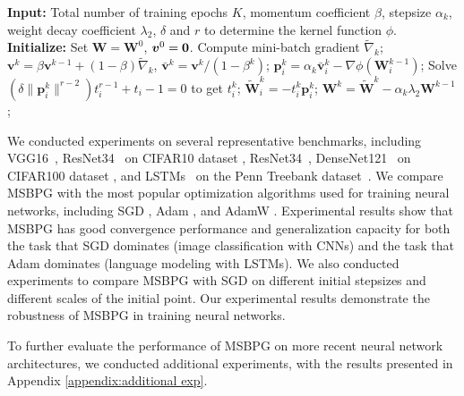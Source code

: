 \documentclass[twoside,11pt]{article}
\def\vp{{\bm{p}}}
\def\vv{{\bm{v}}}
\def\mW{{\bm{W}}}
\begin{document}
\begin{algorithm}[ht] 
    \caption{MSBPG with $L_2$ regularization}
    \begin{algorithmic}[1]
        \State \textbf{Input: }Total number of training epochs $K$, momentum coefficient $\beta$, stepsize $\alpha_k$, weight decay coefficient $\lambda_2$, $\delta$ and $r$ to determine the kernel function $\phi$.
        \State \textbf{Initialize: } Set $\mW=\mW^0$, $\vv^0=\bf{0}$.
        \State Compute mini-batch gradient ${\widetilde{\nabla}_k}$;
        \State $\vv^k = \beta\vv^{k-1} + (1-\beta) {\widetilde{\nabla}_k}$, $\bar{\vv}^k = \vv^k / (1 - \beta^k)$;
        \State $\vp_i^k = \alpha_k \bar{\vv}_i^k - \nabla\phi(\mW^{k-1}_i)$;
        \State Solve $(\delta \|\vp^k_i\|^{r-2})t_i^{r-1} + t_i -1 =0$ to get $t_i^k$;
        \State $\widetilde{\mW}_i^{k} = - t_i^k \vp_i^k$;
        \EndFor
        \State $\mW^k = \widetilde{\mW}^k - \alpha_k \lambda_2 \mW^{k-1}$;
        \EndFor
        \State {\bf Output: $\mW^1, \cdots, \mW^K$}
    \end{algorithmic}\label{dl-alg-sbpg}
\end{algorithm}


{We conducted experiments on several representative benchmarks, including VGG16~\citep{simonyan2014very}, ResNet34~\citep{he2016deep} on CIFAR10 dataset \citep{krizhevsky2009learning}, ResNet34~\citep{he2016deep}, DenseNet121~\citep{huang2017densely} on CIFAR100 dataset \citep{krizhevsky2009learning},
and LSTMs~\citep{schmidhuber1997long} on the Penn Treebank dataset~\citep{marcinkiewicz1994building}. } We compare MSBPG  with the most popular optimization algorithms used for training neural networks, including SGD \citep{sutskever2013importance}, Adam \citep{kingma2014adam}, and AdamW \citep{loshchilov2017decoupled}. Experimental results show that MSBPG has good convergence performance and generalization capacity for both the task that SGD dominates (image classification with CNNs) and the task that Adam dominates (language modeling with LSTMs). We also conducted experiments to compare MSBPG  with SGD on different initial stepsizes and different scales of the initial point. Our experimental results demonstrate the robustness of MSBPG  in training neural networks.

{
To further evaluate the performance of MSBPG on more recent neural network architectures, we conducted additional experiments, with the results presented in Appendix \ref{appendix:additional exp}.}
\end{document}
